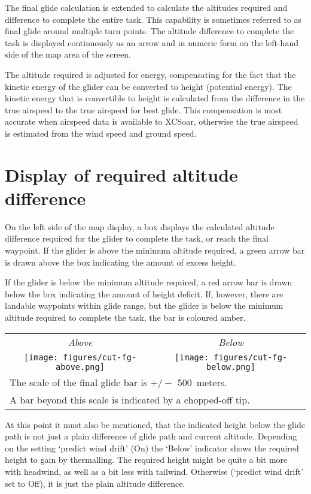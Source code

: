 The final glide calculation is extended to calculate the altitudes
required and difference to complete the entire task.  This capability
is sometimes referred to as final glide around multiple turn points.
The altitude difference to complete the task is displayed continuously
as an arrow and in numeric form on the left-hand side of the map area
of the screen.

The altitude required is adjusted for energy, compensating for
the fact that the kinetic energy of the glider can be converted to
height (potential energy).  The kinetic energy that is convertible to
height is calculated from the difference in the true airspeed to the
true airspeed for best glide.  This compensation is most accurate when
airspeed data is available to XCSoar, otherwise the true airspeed is
estimated from the wind speed and ground speed.


\section{Display of required altitude difference}

On the left side of the map display, a box displays the calculated
altitude difference required for the glider to complete the task, or
reach the final waypoint.  If the glider is above the minimum altitude
required, a green arrow bar is drawn above the box indicating the
amount of excess height.

If the glider is below the minimum altitude required, a red arrow bar is
drawn below the box indicating the amount of height deficit.  If,
however, there are landable waypoints within glide range, but the
glider is below the minimum altitude required to complete the task, the
bar is coloured amber.

\begin{center}
\begin{tabular}{c c}
\emph{Above} & \emph{Below} \\
\texttt{[image: figures/cut-fg-above.png]} &
\texttt{[image: figures/cut-fg-below.png]} \\
\multicolumn{2}{l}{The scale of the final glide bar is $+/-$ 500~meters.} \\
\multicolumn{2}{l}{A bar beyond this scale is indicated by a chopped-off tip.}
\end{tabular}
\end{center}
\tip{}
At this point it must also be mentioned, that the indicated height below the glide
path is not just a plain difference of glide path and current altitude. Depending 
on the setting `predict wind drift' (On) the `Below' indicator 
shows the required height to gain by thermalling. 
The required height might be quite a bit more with headwind, as well as a bit less
with tailwind. 
Otherwise (`predict wind drift' set to Off), it is just the plain
altitude difference.



